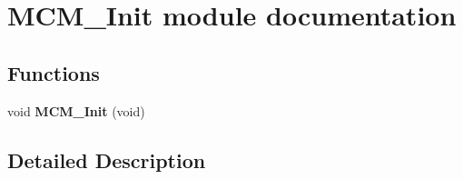 \hypertarget{group___m_c_m___init__module}{}\section{M\+C\+M\+\_\+\+Init module documentation}
\label{group___m_c_m___init__module}
\subsection*{Functions}
\begin{DoxyCompactItemize}
\item 
void {\bfseries M\+C\+M\+\_\+\+Init} (void)\hypertarget{group___m_c_m___init__module_ga3b9e90d5af5cc86f3d9d816ca335d687}{}\label{group___m_c_m___init__module_ga3b9e90d5af5cc86f3d9d816ca335d687}

\end{DoxyCompactItemize}


\subsection{Detailed Description}
